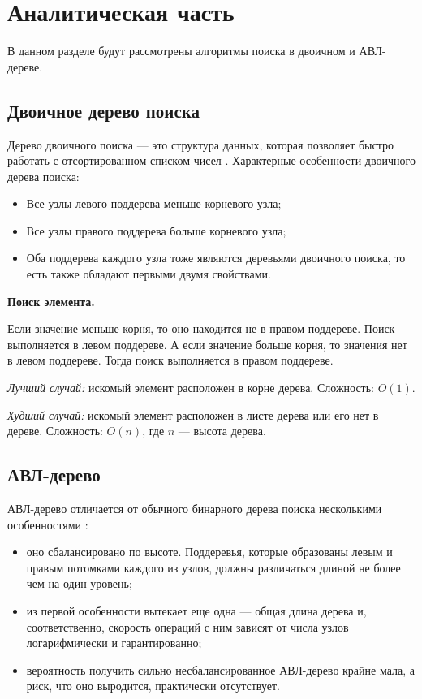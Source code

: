 \chapter{Аналитическая часть}
В данном разделе будут рассмотрены алгоритмы поиска в двоичном и АВЛ-дереве.

\section{Двоичное дерево поиска}

Дерево двоичного поиска — это структура данных, которая позволяет быстро работать с отсортированном списком чисел \cite{ddp}. Характерные особенности двоичного дерева поиска:

\begin{itemize}[label=---]
	\item Все узлы левого поддерева меньше корневого узла;
	\item Все узлы правого поддерева больше корневого узла;
	\item Оба поддерева каждого узла тоже являются деревьями двоичного поиска, то есть также обладают первыми двумя свойствами. 
\end{itemize}

\textbf{Поиск элемента.}

Если значение меньше корня, то оно находится не в правом поддереве. Поиск выполняется в левом поддереве. А если значение больше корня, то значения нет в левом поддереве. Тогда поиск выполняется в правом поддереве.

\textit{Лучший случай:} искомый элемент расположен в корне дерева. Сложность: $O(1)$.

\textit{Худший случай:} искомый элемент расположен в листе дерева или его нет в дереве. Сложность: $O(n)$, где $n$ --- высота дерева.

\section{АВЛ-дерево}

АВЛ-дерево отличается от обычного бинарного дерева поиска несколькими особенностями \cite{avl}:

\begin{itemize}[label=---]
	\item оно сбалансировано по высоте. Поддеревья, которые образованы левым и правым потомками каждого из узлов, должны различаться длиной не более чем на один уровень;
	\item из первой особенности вытекает еще одна --- общая длина дерева и, соответственно, скорость операций с ним зависят от числа узлов логарифмически и гарантированно;
	\item вероятность получить сильно несбалансированное АВЛ-дерево крайне мала, а риск, что оно выродится, практически отсутствует.
\end{itemize}


